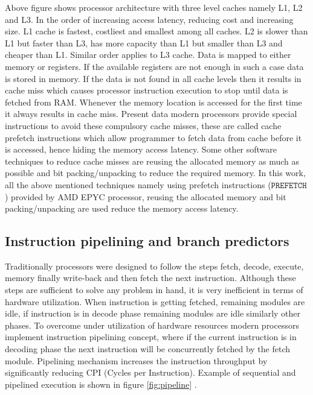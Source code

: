 Above figure shows processor architecture with three level caches namely L1, L2 and L3. In the order of increasing access latency, reducing cost and increasing size. L1 cache is fastest, costliest and smallest among all caches. L2 is slower than L1 but faster than L3, has more capacity than L1 but smaller than L3 and cheaper than L1. Similar order applies to L3 cache. Data is mapped to either memory or registers. If the available registers are not enough in such a case data is stored in memory. If the data is not found in all cache levels then it results in cache miss which causes processor instruction execution to stop until data is fetched from RAM. Whenever the memory location is accessed for the first time it always results in cache miss. Present data modern processors provide special instructions to avoid these compulsory cache misses, these are called cache prefetch instructions which allow programmer to fetch data from cache before it is accessed, hence hiding the memory access latency. Some other software techniques to reduce cache misses are reusing the allocated memory as much as possible and bit packing/unpacking to reduce the required memory. In this work, all the above mentioned techniques namely using prefetch instructions ($\mathtt{PREFETCH}$) provided by AMD EPYC processor, reusing the allocated memory and bit packing/unpacking are used reduce the memory access latency.

\subsection{Instruction pipelining and branch predictors}
Traditionally processors were designed to follow the steps fetch, decode, execute, memory finally write-back and then fetch the next instruction. Although these steps are sufficient to solve any problem in hand, it is very inefficient in terms of hardware utilization. When instruction is getting fetched, remaining modules are idle, if instruction is in decode phase remaining modules are idle similarly other phases. To overcome under utilization of hardware resources modern processors implement instruction pipelining concept, where if the current instruction is in decoding phase the next instruction will be concurrently fetched by the fetch module. Pipelining mechanism increases the instruction throughput by significantly reducing CPI (Cycles per Instruction). Example of sequential and pipelined execution is shown in figure \ref{fig:pipeline} \cite{SoCT}.


